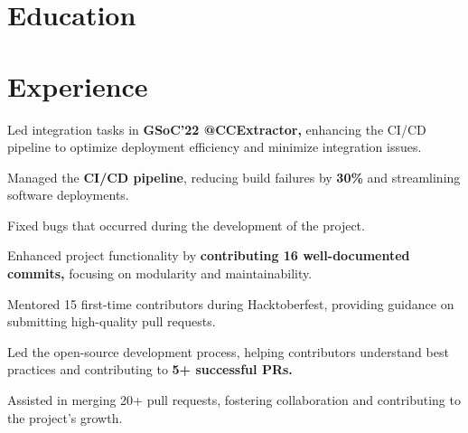 \documentclass[]{deedy-resume-openfont}
\begin{document}
\section{Education}
\hfill {}
\sectionsep

\hfill {}
\sectionsep

\hfill {}
\sectionsep

\section{Experience}
\hfill {}
\begin{tightemize}
	\item Led integration tasks in \textbf{GSoC'22 @CCExtractor,} enhancing the CI/CD pipeline to optimize deployment efficiency and minimize integration issues.
	\item Managed the \textbf{CI/CD pipeline}, reducing build failures by \textbf{30\%} and streamlining software deployments.
	\item Fixed bugs that occurred during the development of the project.
	\item Enhanced project functionality by \textbf{contributing 16 well-documented commits,} focusing on modularity and maintainability.
\end{tightemize}
\sectionsep

\hfill {}
\begin{tightemize}
	\item Mentored 15 first-time contributors during Hacktoberfest, providing guidance on submitting high-quality pull requests.
	\item Led the open-source development process, helping contributors understand best practices and contributing to \textbf{5+ successful PRs.}
	\item Assisted in merging 20+ pull requests, fostering collaboration and contributing to the project's growth.
\end{tightemize}
\sectionsep
\end{document}
